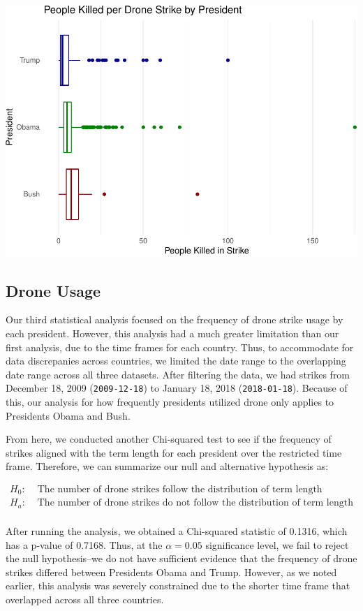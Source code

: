 \documentclass[
]{article}
\begin{document}
\begin{center}\includegraphics[width=0.75\linewidth]{strike-report_files/figure-latex/drone_leth_posthoc2-1} \end{center}

\hypertarget{drone-usage}{%
\subsection{Drone Usage}\label{drone-usage}}

Our third statistical analysis focused on the frequency of drone strike
usage by each president. However, this analysis had a much greater
limitation than our first analysis, due to the time frames for each
country. Thus, to accommodate for data discrepanies across countries, we
limited the date range to the overlapping date range across all three
datasets. After filtering the data, we had strikes from December 18,
2009 (\texttt{2009-12-18}) to January 18, 2018 (\texttt{2018-01-18}).
Because of this, our analysis for how frequently presidents utilized
drone only applies to Presidents Obama and Bush.

From here, we conducted another Chi-squared test to see if the frequency
of strikes aligned with the term length for each president over the
restricted time frame. Therefore, we can summarize our null and
alternative hypothesis as:

\[
\begin{aligned}
H_0: & \text{ The number of drone strikes follow the distribution of term length} \\
H_a: & \text{ The number of drone strikes do not follow the distribution of term length} \\
\end{aligned}
\]

After running the analysis, we obtained a Chi-squared statistic of
0.1316, which has a p-value of 0.7168. Thus, at the \(\alpha = 0.05\)
significance level, we fail to reject the null hypothesis--we do not
have sufficient evidence that the frequency of drone strikes differed
between Presidents Obama and Trump. However, as we noted earlier, this
analysis was severely constrained due to the shorter time frame that
overlapped across all three countries.
\end{document}
